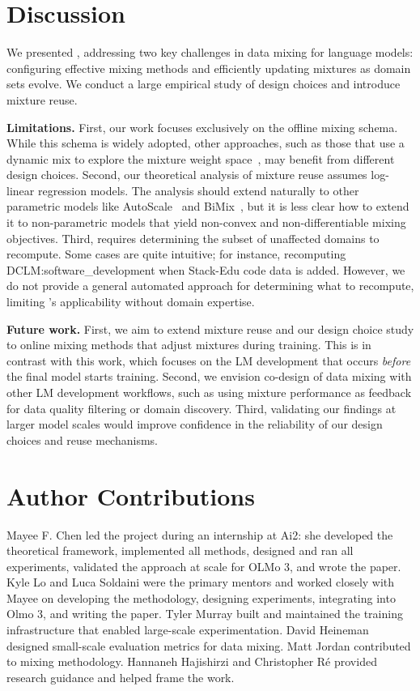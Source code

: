 \section{Discussion}

We presented \olmix, addressing two key challenges in data mixing for language models: configuring effective mixing methods and efficiently updating mixtures as domain sets evolve. We conduct a large empirical study of design choices and introduce mixture reuse. 

\textbf{Limitations.} First, our work focuses exclusively on the offline mixing schema. While this schema is widely adopted, other approaches, such as those that use a dynamic mix to explore the mixture weight space~\citep{xie2023doremioptimizingdatamixtures, fan2024dogedomainreweightinggeneralization}, may benefit from different design choices. Second, our theoretical analysis of mixture reuse assumes log-linear regression models. The analysis should extend naturally to other parametric models like AutoScale~\citep{kang2025autoscalescaleawaredatamixing} and BiMix~\citep{ge2025bimixbivariatedatamixing}, but it is less clear how to extend it to non-parametric models that yield non-convex and non-differentiable mixing objectives.
Third, \partialmixreuse requires determining the subset of unaffected domains to recompute. Some cases are quite intuitive; for instance, recomputing DCLM:software\_development when Stack-Edu code data is added. However, we do not provide a general automated approach for determining what to recompute, limiting \partialmixreuse's applicability without domain expertise. 

\textbf{Future work.} First, we aim to extend mixture reuse and our design choice study to online mixing methods that adjust mixtures during training. This is in contrast with this work, which focuses on the LM development that occurs \textit{before} the final model starts training. Second, we envision co-design of data mixing with other LM development workflows, such as using mixture performance as feedback for data quality filtering or domain discovery. Third, validating our findings at larger model scales would improve confidence in the reliability of our design choices and reuse mechanisms.


\section*{Author Contributions}

Mayee F. Chen led the project during an internship at Ai2: she developed the theoretical framework, implemented all methods, designed and ran all experiments, validated the approach at scale for OLMo 3, and wrote the paper. Kyle Lo and Luca Soldaini were the primary mentors and worked closely with Mayee on developing the methodology, designing experiments, integrating into Olmo 3, and writing the paper. Tyler Murray built and maintained the training infrastructure that enabled large-scale experimentation. David Heineman designed small-scale evaluation metrics for data mixing. Matt Jordan contributed to mixing methodology. Hannaneh Hajishirzi and Christopher R\'{e} provided research guidance and helped frame the work.

